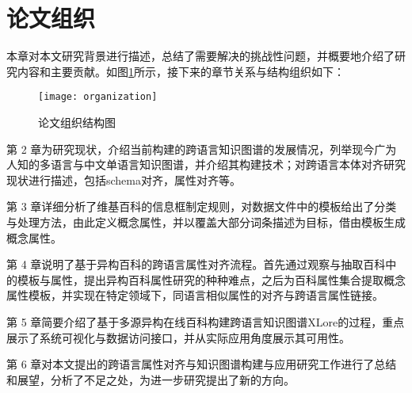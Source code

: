 \section{论文组织}

本章对本文研究背景进行描述，总结了需要解决的挑战性问题，并概要地介绍了研究内容和主要贡献。如图\ref{fig:organization}所示，接下来的章节关系与结构组织如下：

\begin{figure}[ht] 
  \centering
  \texttt{[image: organization]}
  \caption{论文组织结构图}
  \label{fig:organization}
\end{figure}

第 2 章为研究现状，介绍当前构建的跨语言知识图谱的发展情况，列举现今广为人知的多语言与中文单语言知识图谱，并介绍其构建技术；对跨语言本体对齐研究现状进行描述，包括schema对齐，属性对齐等。

第 3 章详细分析了维基百科的信息框制定规则，对数据文件中的模板给出了分类与处理方法，由此定义概念属性，并以覆盖大部分词条描述为目标，借由模板生成概念属性。

第 4 章说明了基于异构百科的跨语言属性对齐流程。首先通过观察与抽取百科中的模板与属性，提出异构百科属性研究的种种难点，之后为百科属性集合提取概念属性模板，并实现在特定领域下，同语言相似属性的对齐与跨语言属性链接。

第 5 章简要介绍了基于多源异构在线百科构建跨语言知识图谱XLore的过程，重点展示了系统可视化与数据访问接口，并从实际应用角度展示其可用性。

第 6 章对本文提出的跨语言属性对齐与知识图谱构建与应用研究工作进行了总结和展望，分析了不足之处，为进一步研究提出了新的方向。

